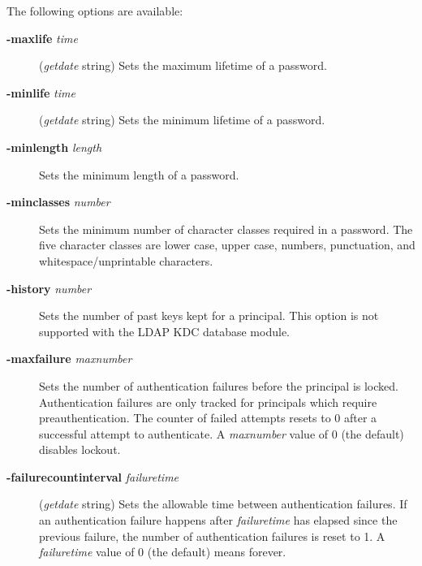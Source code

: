 \documentclass[letterpaper,10pt,english]{sphinxmanual}
\begin{document}
The following options are available:
\begin{description}
\item[{\textbf{-maxlife} \emph{time}}] \leavevmode
(\emph{getdate} string) Sets the maximum lifetime of a password.

\item[{\textbf{-minlife} \emph{time}}] \leavevmode
(\emph{getdate} string) Sets the minimum lifetime of a password.

\item[{\textbf{-minlength} \emph{length}}] \leavevmode
Sets the minimum length of a password.

\item[{\textbf{-minclasses} \emph{number}}] \leavevmode
Sets the minimum number of character classes required in a
password.  The five character classes are lower case, upper case,
numbers, punctuation, and whitespace/unprintable characters.

\item[{\textbf{-history} \emph{number}}] \leavevmode
Sets the number of past keys kept for a principal.  This option is
not supported with the LDAP KDC database module.

\end{description}
\label{admin/admin_commands/kadmin_local:policy-maxfailure}\begin{description}
\item[{\textbf{-maxfailure} \emph{maxnumber}}] \leavevmode
Sets the number of authentication failures before the principal is
locked.  Authentication failures are only tracked for principals
which require preauthentication.  The counter of failed attempts
resets to 0 after a successful attempt to authenticate.  A
\emph{maxnumber} value of 0 (the default) disables lockout.

\end{description}
\label{admin/admin_commands/kadmin_local:policy-failurecountinterval}\begin{description}
\item[{\textbf{-failurecountinterval} \emph{failuretime}}] \leavevmode
(\emph{getdate} string) Sets the allowable time between
authentication failures.  If an authentication failure happens
after \emph{failuretime} has elapsed since the previous failure,
the number of authentication failures is reset to 1.  A
\emph{failuretime} value of 0 (the default) means forever.

\end{description}
\end{document}

